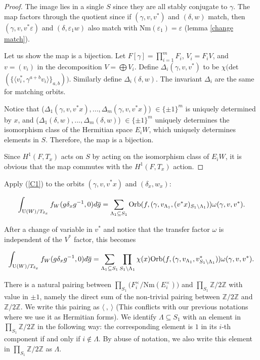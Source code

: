 \documentclass[11pt, oneside,reqno]{amsart}   	%
\begin{document}
\begin{proof}
The image lies in a single $S$ since they are all stably conjugate to $\gamma$. The map factors through the quotient since if $(\gamma,v,v^*)$ and $(\delta,w)$ match, then $(\gamma,v, v^*\varepsilon)$ and $(\delta,\varepsilon_1 w)$ also match with Nm$(\varepsilon_1)=\varepsilon$ (lemma \ref{change match}).

Let us show the map is a bijection. Let $F[\gamma]=\prod_{i=1}^m F_i$, $V_i=F_iV$, and $v=(v_i)$ in the decomposition $V=\bigoplus V_i$. Define $\Delta_i(\gamma,v,v^*)$ to be $\chi($det$(\{\langle v^*_i,\gamma^{a+b}v_i\rangle\}_{a,b}))$. Similarly define $\Delta_i(\delta,w)$. The invariant $\Delta_i$ are the same for matching orbits. 

Notice that ($\Delta_1(\gamma, v, v^*x),...,\Delta_m(\gamma, v, v^*x)$) $\in \{\pm 1\}^m$ is uniquely determined by $x$, and ($\Delta_1(\delta, w),...,\Delta_m(\delta, w)$) $\in \{\pm 1\}^m$ uniquely determines the isomorphism class of the Hermitian space $E_iW $, which uniquely determines  elements in $S$. Therefore, the map is a bijection.

Since $H^1(F,T_x)$ acts on $S$ by acting on the isomorphism class of $E_iW$, it is obvious that the map commutes with the $H^1(F,T_x)$ action.

\end{proof}


Apply (\ref{C1}) to the orbits $(\gamma, v, v^*x)$ and $(\delta_x,w_x)$:

$$\int_{\textup{U}(W)/T_{\delta_x}}f_W(g\delta_x g^{-1},0)d\overline{g}=\sum_{\Lambda_1 \subseteq S_1} \textup{Orb}(f,(\gamma,v_{\Lambda_1},(v^*x)_{S_1 \backslash \Lambda_1}))\omega(\gamma,v, v^*).$$

After a change of variable in $v^*$ and notice that the transfer factor $\omega$ is independent of the $V^*$ factor, this becomes

$$\int_{\textup{U}(W)/T_{\delta_x}}f_W(g\delta_x g^{-1},0)d\overline{g}=\sum_{\Lambda_1 \subseteq S_1} \prod_{S_1 \backslash \Lambda_1}\chi(x) \textup{Orb}(f,(\gamma,v_{\Lambda_1},v^*_{S_1 \backslash \Lambda_1}))\omega(\gamma,v, v^*).$$

There is a natural pairing between $\prod_{S_1} (F_i^\times/$Nm$(E_i^\times))$ and $\prod_{S_1} \mathbb{Z}/2\mathbb{Z}$ with value in $\pm 1$, namely the direct sum of the non-trivial pairing between $\mathbb{Z}/2\mathbb{Z}$ and $\mathbb{Z}/2\mathbb{Z}$. We write this pairing as $\langle \ , \ \rangle$ (This conflicts with our previous notations where we use it as Hermitian forms).  We identify $\Lambda \subseteq S_1$ with an element in $\prod_{S_1} \mathbb{Z}/2\mathbb{Z}$ in the following way: the corresponding element is $1$ in its $i$-th component if and only if $i \notin \Lambda$. By abuse of notation, we also write this element in $\prod_{S_1} \mathbb{Z}/2\mathbb{Z}$  as $\Lambda$.  
\end{document}
